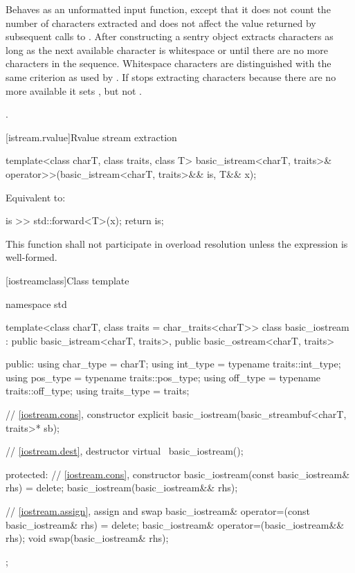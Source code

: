 \begin{itemdescr}
\pnum
\effects
Behaves as an unformatted input function, except that it does not count the number of characters extracted and
does not affect the value returned by subsequent calls to . After
constructing a sentry object extracts characters as long as the next available
character  is whitespace or until there are no more characters in the sequence.
Whitespace characters are distinguished with the same criterion as used by
.
If
stops extracting characters because there are no more available it sets
,
but not
.

\pnum
\returns
{}.
\end{itemdescr}

[istream.rvalue]{Rvalue stream extraction}

%
\begin{itemdecl}
template<class charT, class traits, class T>
  basic_istream<charT, traits>& operator>>(basic_istream<charT, traits>&& is, T&& x);
\end{itemdecl}

\begin{itemdescr}
\pnum
\effects Equivalent to:
\begin{codeblock}
is >> std::forward<T>(x);
return is;
\end{codeblock}

\pnum
\remarks This function shall not participate in overload resolution
unless the expression  is well-formed.
\end{itemdescr}

[iostreamclass]{Class template }

%
\begin{codeblock}
namespace std {
  template<class charT, class traits = char_traits<charT>>
  class basic_iostream
    : public basic_istream<charT, traits>,
      public basic_ostream<charT, traits> {
  public:
    using char_type   = charT;
    using int_type    = typename traits::int_type;
    using pos_type    = typename traits::pos_type;
    using off_type    = typename traits::off_type;
    using traits_type = traits;

    // \ref{iostream.cons}, constructor
    explicit basic_iostream(basic_streambuf<charT, traits>* sb);

    // \ref{iostream.dest}, destructor
    virtual ~basic_iostream();

  protected:
    // \ref{iostream.cons}, constructor
    basic_iostream(const basic_iostream& rhs) = delete;
    basic_iostream(basic_iostream&& rhs);

    // \ref{iostream.assign}, assign and swap
    basic_iostream& operator=(const basic_iostream& rhs) = delete;
    basic_iostream& operator=(basic_iostream&& rhs);
    void swap(basic_iostream& rhs);
  };
}
\end{codeblock}

